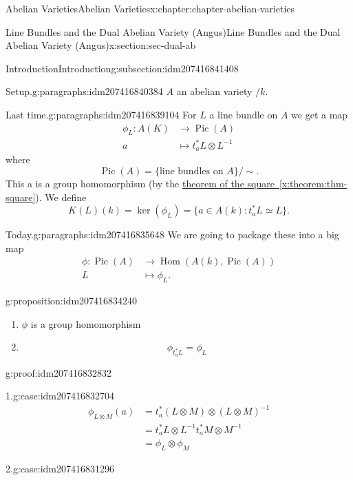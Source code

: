 \documentclass[oneside,10pt,]{book}
\numberwithin{equation}{section}
\DeclareMathOperator{\Hom}{Hom}
\DeclareMathOperator{\Pic}{Pic}
\newcommand{\amp}{&}
\begin{document}
\begin{chapterptx}{Abelian Varieties}{}{Abelian Varieties}{}{}{x:chapter:chapter-abelian-varieties}
\begin{sectionptx}{Line Bundles and the Dual Abelian Variety (Angus)}{}{Line Bundles and the Dual Abelian Variety (Angus)}{}{}{x:section:sec-dual-ab}
\begin{subsectionptx}{Introduction}{}{Introduction}{}{}{g:subsection:idm207416841408}
\begin{paragraphs}{Setup.}{g:paragraphs:idm207416840384}
\(A\) an abelian variety \(/k\).%
\end{paragraphs}%
\begin{paragraphs}{Last time.}{g:paragraphs:idm207416839104}%
For \(L\) a line bundle on \(A\) we get a map%
\begin{align*}
\phi_L\colon A(K) \amp\to \Pic(A)\\
a\amp\mapsto t_a^* L\otimes L^{-1}
\end{align*}
where%
\begin{equation*}
\Pic(A) = \{\text{line bundles on } A\}/\sim\text{.}
\end{equation*}
This a is a group homomorphism (by the \hyperref[x:theorem:thm-square]{theorem of the square~\ref{x:theorem:thm-square}}). We define%
\begin{equation*}
K(L)(k) = \ker(\phi_L) = \{a\in A(k) : t_a^* L \simeq L\}\text{.}
\end{equation*}
%
\end{paragraphs}%
\begin{paragraphs}{Today.}{g:paragraphs:idm207416835648}%
We are going to package these into a big map%
\begin{align*}
\phi\colon \Pic(A)\amp\to \Hom(A(k), \Pic(A))\\
L \amp\mapsto \phi_L\text{.}
\end{align*}
%
\begin{proposition}{}{}{g:proposition:idm207416834240}%
%
\begin{enumerate}
\item{}\(\phi\) is a group homomorphism%
\item{}%
\begin{equation*}
\phi_{t_a^* L}  = \phi_L
\end{equation*}
%
\end{enumerate}
%
\end{proposition}
\begin{proofptx}{}{g:proof:idm207416832832}
\begin{case}{}{1.}{g:case:idm207416832704}
%
\begin{align*}
\phi_{L\otimes M}(a) \amp = t_a^*(L\otimes M) \otimes(L\otimes M)^{-1}\\
\amp = t_a^*L\otimes L^{-1} t_a^*M\otimes M^{-1}\\
\amp = \phi_L\otimes \phi_M
\end{align*}
%
\end{case}
\begin{case}{}{2.}{g:case:idm207416831296}
%
\begin{align*}

\end{align*}
\end{case}
\end{proofptx}
\end{paragraphs}
\end{subsectionptx}
\end{sectionptx}
\end{chapterptx}
\end{document}
